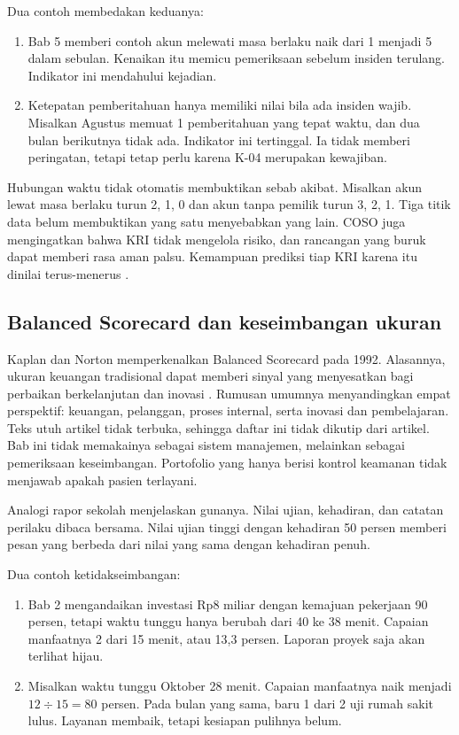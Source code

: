 Dua contoh membedakan keduanya:
\begin{enumerate}
  \item Bab 5 memberi contoh akun melewati masa berlaku naik dari 1 menjadi 5 dalam sebulan.
  Kenaikan itu memicu pemeriksaan sebelum insiden terulang. Indikator ini mendahului kejadian.
  \item Ketepatan pemberitahuan hanya memiliki nilai bila ada insiden wajib. Misalkan Agustus
  memuat 1 pemberitahuan yang tepat waktu, dan dua bulan berikutnya tidak ada. Indikator ini
  tertinggal. Ia tidak memberi peringatan, tetapi tetap perlu karena K-04 merupakan kewajiban.
\end{enumerate}

Hubungan waktu tidak otomatis membuktikan sebab akibat. Misalkan akun lewat masa berlaku turun 2,
1, 0 dan akun tanpa pemilik turun 3, 2, 1. Tiga titik data belum membuktikan yang satu menyebabkan
yang lain. COSO juga mengingatkan bahwa KRI tidak mengelola risiko, dan rancangan yang buruk dapat
memberi rasa aman palsu. Kemampuan prediksi tiap KRI karena itu dinilai terus-menerus
\cite{c13-coso-kri}.

\subsection*{Balanced Scorecard dan keseimbangan ukuran}

Kaplan dan Norton memperkenalkan Balanced Scorecard pada 1992. Alasannya, ukuran keuangan
tradisional dapat memberi sinyal yang menyesatkan bagi perbaikan berkelanjutan dan inovasi
\cite{c13-kaplan1992}. Rumusan umumnya menyandingkan empat perspektif: keuangan, pelanggan, proses
internal, serta inovasi dan pembelajaran. Teks utuh artikel tidak terbuka, sehingga daftar ini
tidak dikutip dari artikel. Bab ini tidak memakainya sebagai sistem
manajemen, melainkan sebagai pemeriksaan keseimbangan. Portofolio yang hanya berisi kontrol
keamanan tidak menjawab apakah pasien terlayani.

Analogi rapor sekolah menjelaskan gunanya. Nilai ujian, kehadiran, dan catatan perilaku dibaca
bersama. Nilai ujian tinggi dengan kehadiran 50 persen memberi pesan yang berbeda dari nilai yang
sama dengan kehadiran penuh.

Dua contoh ketidakseimbangan:
\begin{enumerate}
  \item Bab 2 mengandaikan investasi Rp8 miliar dengan kemajuan pekerjaan 90 persen, tetapi waktu
  tunggu hanya berubah dari 40 ke 38 menit. Capaian manfaatnya 2 dari 15 menit, atau 13,3 persen.
  Laporan proyek saja akan terlihat hijau.
  \item Misalkan waktu tunggu Oktober 28 menit. Capaian manfaatnya naik menjadi $12 \div 15 = 80$
  persen. Pada bulan yang sama, baru 1 dari 2 uji rumah sakit lulus. Layanan membaik, tetapi
  kesiapan pulihnya belum.
\end{enumerate}

